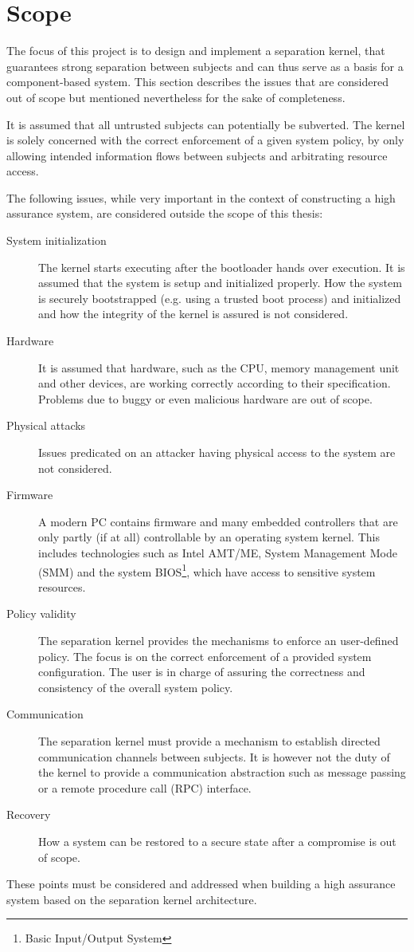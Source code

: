 \section{Scope}
The focus of this project is to design and implement a separation kernel, that
guarantees strong separation between subjects and can thus serve as a basis for
a component-based system. This section describes the issues that are considered
out of scope but mentioned nevertheless for the sake of completeness.

It is assumed that all untrusted subjects can potentially be subverted. The
kernel is solely concerned with the correct enforcement of a given system
policy, by only allowing intended information flows between subjects and
arbitrating resource access.

The following issues, while very important in the context of constructing a
high assurance system, are considered outside the scope of this thesis:

\begin{description}
	\item[System initialization] The kernel starts executing after the
		bootloader hands over execution. It is assumed that the system is setup
		and initialized properly. How the system is securely bootstrapped (e.g.
		using a trusted boot process) and initialized and how the integrity of
		the kernel is assured is not considered.
	\item[Hardware] It is assumed that hardware, such as the CPU, memory
		management unit and other devices, are working correctly according to
		their specification. Problems due to buggy or even malicious hardware
		are out of scope.
	\item[Physical attacks] Issues predicated on an attacker having physical
		access to the system are not considered.
	\item[Firmware] A modern PC contains firmware and many embedded controllers
		that are only partly (if at all) controllable by an operating system
		kernel. This includes technologies such as Intel AMT/ME, System
		Management Mode (SMM) and the system BIOS\footnote{Basic
		Input/Output System}, which have access to sensitive system resources.
	\item[Policy validity] The separation kernel provides the mechanisms to
		enforce an user-defined policy. The focus is on the correct enforcement
		of a provided system configuration. The user is in charge of assuring
		the correctness and consistency of the overall system policy.
	\item[Communication] The separation kernel must provide a mechanism to
		establish directed communication channels between subjects.	It is
		however not the duty of the kernel to provide a	communication
		abstraction such as message passing or a remote procedure call (RPC)
		interface.
	\item[Recovery] How a system can be restored to a secure state after a
		compromise is out of scope.
\end{description}

These points must be considered and addressed when building a high assurance
system based on the separation kernel architecture.

